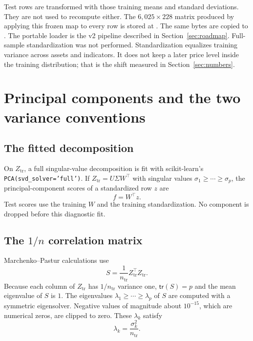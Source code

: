 \documentclass[11pt]{article}
\newcommand{\tr}{\mathsf{tr}}
\begin{document}
Test rows are transformed with those training means and standard deviations.
They are not used to recompute either.
The \(6{,}025\times 228\) matrix produced by applying this frozen map to every row is stored at .
The same bytes are copied to .
The portable loader is the v2 pipeline described in Section~\ref{sec:roadmap}.
Full-sample standardization was not performed.
Standardization equalizes training variance across assets and indicators.
It does not keep a later price level inside the training distribution; that is the shift measured in Section~\ref{sec:numbers}.

\section{Principal components and the two variance conventions}
\label{sec:pca}

\subsection{The fitted decomposition}

On \(Z_{\mathrm{tr}}\), a full singular-value decomposition is fit with scikit-learn's \texttt{PCA(svd\_solver='full')}.
If \(Z_{\mathrm{tr}}=U\Sigma W^{\top}\) with singular values \(\sigma_1\ge\cdots\ge\sigma_p\), the principal-component scores of a standardized row \(z\) are
\[
f=W^{\top}z.
\]
Test scores use the training \(W\) and the training standardization.
No component is dropped before this diagnostic fit.

\subsection{The \texorpdfstring{\(1/n\)}{1/n} correlation matrix}

Marchenko--Pastur calculations use
\begin{equation}
\label{eq:sn}
S=\frac{1}{n_{\mathrm{tr}}}Z_{\mathrm{tr}}^{\top}Z_{\mathrm{tr}}.
\end{equation}
Because each column of \(Z_{\mathrm{tr}}\) has \(1/n_{\mathrm{tr}}\) variance one, \(\tr(S)=p\) and the mean eigenvalue of \(S\) is \(1\).
The eigenvalues \(\lambda_1\ge\cdots\ge\lambda_p\) of \(S\) are computed with a symmetric eigensolver.
Negative values of magnitude about \(10^{-15}\), which are numerical zeros, are clipped to zero.
These \(\lambda_k\) satisfy
\begin{equation}
\label{eq:singular}
\lambda_k=\frac{\sigma_k^2}{n_{\mathrm{tr}}}.
\end{equation}
\end{document}
